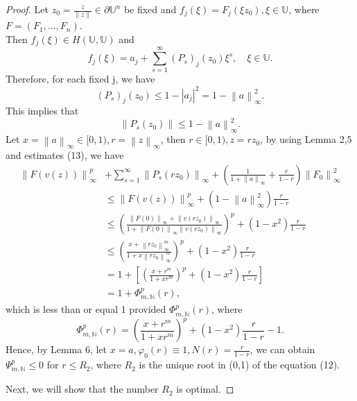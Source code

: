 \documentclass[10pt,a4paper]{amsart}
\begin{document}
\begin{proof}
	Let $z_0=\frac{z}{\left \| z \right \| } \in \partial \mathbb{U} ^n$ be fixed and $f_j(\xi )=F_j(\xi z_0),\xi \in \mathbb{U} $, where $F=(F_1,\dots ,F_n)$.\\
	Then $f_j(\xi )\in H(\mathbb{U},\mathbb{U} )$ and
	\begin{equation*}
		f_j(\xi )=a_j+\sum_{s=1}^{\infty} (P_s)_j(z_0)\xi ^s, \quad \xi \in \mathbb{U}.
	\end{equation*}
	Therefore, for each fixed j, we have
	\begin{equation*}
		(P_s)_j(z_0)\le 1-\left | a_j \right | ^2=1-\left \| a \right \| ^2_{\infty}.
	\end{equation*}
	This implies that
	\begin{equation}
		\left \| P_s(z_0) \right \| \le 1-\left \| a \right \| ^2_{\infty}.
	\end{equation}
		Let $x=\left \| a \right \|_{\infty}\in [0,1), r=\left \| z \right \|_{\infty}$, then $ r \in [0,1), z=rz_0$, by using Lemma 2,5 and estimates (13), we have
	\begin{align*}
		\left \| F(v(z)) \right \|_{\infty}^p &+\sum_{s=1}^{\infty}\left \| P_s(rz_0) \right \|_{\infty}+(\frac{1}{1+\left \| a \right \|_{\infty}} +\frac{r}{1-r}  )\left \| F_0 \right \|^2_{\infty} \\
		&\le \left \| F(v(z)) \right \|_{\infty}^p+(1-\left \| a \right \|_{\infty}^2)\frac{r}{1-r}\\
		&\le (\frac{\left \| F(0) \right \|_\infty+\left \| v(rz_0) \right \|_\infty }{1+\left \| F(0) \right \|_\infty\left \| v(rz_0) \right \|_\infty})^p+(1-x^2)\frac{r}{1-r}\\
		&\le (\frac{x+\left \| rz_0 \right \|_\infty^m }{1+x\left \| rz_0 \right \|_\infty^m})^p+(1-x^2)\frac{r}{1-r}\\
		&=1+[(\frac{x+r^m }{1+xr^m})^p+(1-x^2)\frac{r}{1-r}]\\
		&=1+\Phi _{m,\mathbb{N}}^p(r),
	\end{align*}
	which is less than or equal 1 provided $\Phi _{m,\mathbb{N}}^p(r)$, where
	\begin{equation}
	\Phi _{m,\mathbb{N}}^p(r)=(\frac{x+r^m }{1+xr^m})^p+(1-x^2)\frac{r}{1-r}-1.
	\end{equation}
	Hence, by Lemma 6, let $x=a, \varphi _0(r)\equiv 1, N(r)=\frac{r}{1-r} $, we can obtain $\Psi _{m,\mathbb{N}}^p \le 0$ for $r \le R_2$, where $R_2$ is the unique root in (0,1) of the equation (12).
	\par
	Next, we will show that the number $R_2$ is optimal.

\end{proof}
\end{document}
